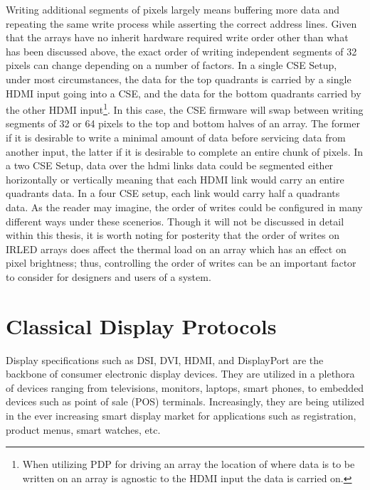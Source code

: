     Writing additional segments of pixels largely means buffering more data and repeating the same write process while asserting the correct address lines. Given that the arrays have no inherit hardware required write order other than what has been discussed above, the exact order of writing independent segments of 32 pixels can change depending on a number of factors. In a single CSE Setup, under most circumstances, the data for the top quadrants is carried by a single HDMI input going into a CSE, and the data for the bottom quadrants carried by the other HDMI input\footnote{When utilizing PDP for driving an array the location of where data is to be written on an array is agnostic to the HDMI input the data is carried on.}. In this case, the CSE firmware will swap between writing segments of 32 or 64 pixels to the top and bottom halves of an array. The former if it is desirable to write a minimal amount of data before servicing data from another input, the latter if it is desirable to complete an entire chunk of pixels. In a two CSE Setup, data over the hdmi links data could be segmented either horizontally or vertically meaning that each HDMI link would carry an entire quadrants data. In a four CSE setup, each link would carry half a quadrants data. As the reader may imagine, the order of writes could be configured in many different ways under these scenerios. Though it will not be discussed in detail within this thesis, it is worth noting for posterity that the order of writes on IRLED arrays does affect the thermal load on an array which has an effect on pixel brightness\cite{BarakhshanEtAl2017, LaVeigneSieglinger2012, norton2}; thus, controlling the order of writes can be an important factor to consider for designers and users of a system.


\section{Classical Display Protocols}
    \label{sec:classical_display_protocols}

    Display specifications such as DSI\cite{HDMIForum2017}, DVI\cite{DDWG1999}, HDMI\cite{HDMIForum2018}, and DisplayPort\cite{VESA2016} are the backbone of consumer electronic display devices. They are utilized in a plethora of devices ranging from televisions, monitors, laptops, smart phones, to embedded devices such as point of sale (POS) terminals. Increasingly, they are being utilized in the ever increasing smart display market for applications such as registration, product menus, smart watches, etc.

